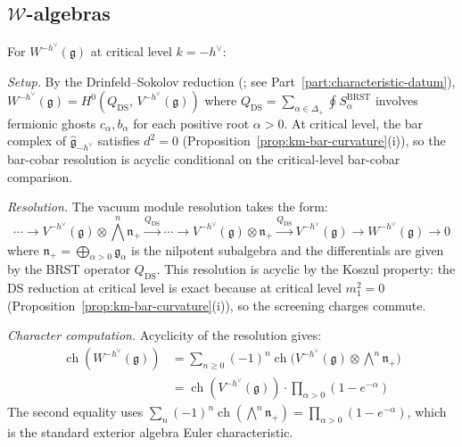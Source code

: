 \subsection{$\mathcal{W}$-algebras}

\begin{calculation}
For $W^{-h^\vee}(\mathfrak{g})$ at critical level $k = -h^\vee$:

\emph{Setup.}
By the Drinfeld--Sokolov reduction (\cite{FF}; see Part~\ref{part:characteristic-datum}),
$W^{-h^\vee}(\mathfrak{g}) = H^0(Q_{\mathrm{DS}},\, V^{-h^\vee}(\mathfrak{g}))$
where $Q_{\mathrm{DS}} = \sum_{\alpha \in \Delta_+} \oint S_\alpha^{\mathrm{BRST}}$
involves fermionic ghosts $c_\alpha, b_\alpha$ for each positive root $\alpha > 0$.
At critical level, the bar complex of $\widehat{\mathfrak{g}}_{-h^\vee}$ satisfies
$d^2 = 0$ (Proposition~\ref{prop:km-bar-curvature}(i)), so the bar-cobar resolution
is acyclic conditional on the critical-level bar-cobar comparison.

\emph{Resolution.}
The vacuum module resolution takes the form:
\[
\cdots \to V^{-h^\vee}(\mathfrak{g}) \otimes \textstyle\bigwedge^n \mathfrak{n}_+
\xrightarrow{Q_{\mathrm{DS}}}
\cdots \to V^{-h^\vee}(\mathfrak{g}) \otimes \mathfrak{n}_+
\xrightarrow{Q_{\mathrm{DS}}} V^{-h^\vee}(\mathfrak{g})
\to W^{-h^\vee}(\mathfrak{g}) \to 0
\]
where $\mathfrak{n}_+ = \bigoplus_{\alpha > 0} \mathfrak{g}_\alpha$ is the nilpotent
subalgebra and the differentials are given by the BRST operator $Q_{\mathrm{DS}}$.
This resolution is acyclic by the Koszul property: the DS reduction at critical level
is exact because at critical level $m_1^2 = 0$ (Proposition~\ref{prop:km-bar-curvature}(i)), so the screening charges commute.

\emph{Character computation.}
Acyclicity of the resolution gives:
\begin{align}
\operatorname{ch}(W^{-h^\vee}(\mathfrak{g}))
&= \sum_{n \geq 0} (-1)^n \operatorname{ch}\bigl(V^{-h^\vee}(\mathfrak{g})
\otimes \textstyle\bigwedge^n \mathfrak{n}_+\bigr) \\
&= \operatorname{ch}(V^{-h^\vee}(\mathfrak{g})) \cdot
\prod_{\alpha > 0} (1 - e^{-\alpha})
\end{align}
The second equality uses $\sum_n (-1)^n \operatorname{ch}(\bigwedge^n \mathfrak{n}_+)
= \prod_{\alpha > 0}(1 - e^{-\alpha})$, which is the standard exterior algebra
Euler characteristic.


\end{calculation}
